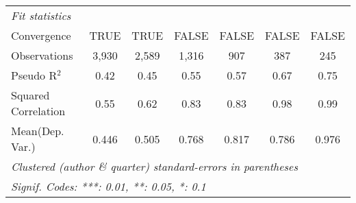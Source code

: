 \begin{tabular}{lcccccc}
   \midrule
   \emph{Fit statistics}\\
   Convergence                                                &TRUE     & TRUE        & FALSE         & FALSE         & FALSE      & FALSE\\  
   Observations                                               & 3,930   & 2,589       & 1,316         & 907           & 387        & 245\\  
   Pseudo R$^2$                                               & 0.42    & 0.45        & 0.55          & 0.57          & 0.67       & 0.75\\  
   Squared Correlation                                        & 0.55    & 0.62        & 0.83          & 0.83          & 0.98       & 0.99\\  
Mean(Dep. Var.) & 0.446 & 0.505 & 0.768 & 0.817 & 0.786 & 0.976 \\
   \midrule \midrule
   \multicolumn{7}{l}{\emph{Clustered (author \& quarter) standard-errors in parentheses}}\\
   \multicolumn{7}{l}{\emph{Signif. Codes: ***: 0.01, **: 0.05, *: 0.1}}\\
\end{tabular}
\par\endgroup
